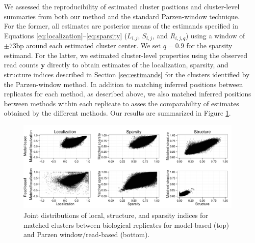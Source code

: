 We assessed the reproducibility of estimated cluster positions and cluster-level summaries from both our method and the standard Parzen-window technique.
For the former, all estimates are posterior means of the estimands specified in Equations \ref{eq:localization}--\ref{eq:sparsity} ($L_{i,j}$, $S_{i,j}$, and $R_{i,j,q}$) using a window of $\pm73$bp around each estimated cluster center.
We set $q = 0.9$ for the sparsity estimand.
For the latter, we estimated cluster-level properties using the observed read counts $\bm y$ directly to obtain estimates of the localization, sparsity, and structure indices described in Section \ref{sec:estimands} for the clusters identified by the Parzen-window method.
In addition to matching inferred positions between replicates for each method, as described above, we also matched inferred positions between methods within each replicate to asses the comparability of estimates obtained by the different methods.
Our results are summarized in Figure \ref{fig:clusterReproducibility}.
%
\ifx\nofigures\undefined
\begin{figure}[t!]
\includegraphics[width=\textwidth]{figures/nucleosomes/figure_cluster_reproducibility_bio}
 \caption{Joint distributions of local, structure, and sparsity indices for matched clusters between biological replicates for model-based (top) and Parzen window/read-based (bottom). \label{fig:clusterReproducibility}}
\end{figure}
\fi

